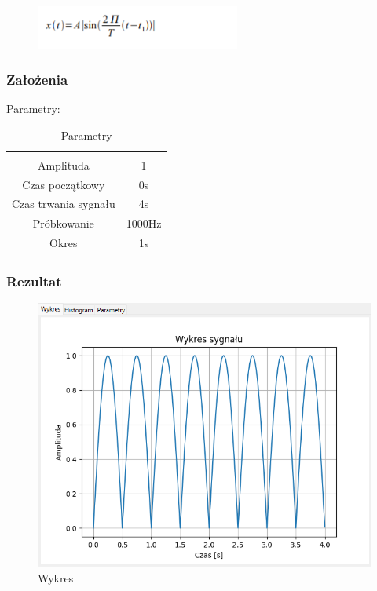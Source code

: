 \documentclass{article}
\begin{document}
\begin{figure}[!htbp]
    \centering
    \includegraphics[width=0.6\textwidth]{img/sinusdwu.png}
\end{figure}
\subsubsection{Założenia}
\noindent
Parametry:
\begin{table}[h!]
    \centering
    \vspace{0.2cm}
    \begin{tabular}{|c|c|}
        \hline\hline\\[-0.4cm]
        Amplituda & 1  \\
        \hline
        Czas początkowy & 0s  \\
        \hline
        Czas trwania sygnału & 4s  \\
        \hline
        Próbkowanie & 1000Hz \\
        \hline
        Okres & 1s\\
        \hline
    \end{tabular}
    \caption{Parametry}
    \label{sinusdwupolowkowy}
\end{table}
\subsubsection{Rezultat}
\begin{figure}[h!]
    \centering
    \includegraphics[width=\textwidth]{img/sinus-dwu/wykres.png}
    \caption{Wykres}
\end{figure}
\end{document}
